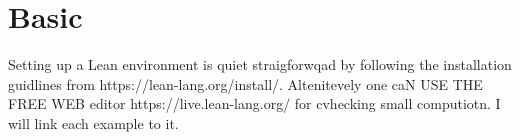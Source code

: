 

\section{Basic}
Setting up a Lean environment is quiet straigforwqad by following 
the installation guidlines from https://lean-lang.org/install/.
Altenitevely one caN USE THE FREE WEB editor https://live.lean-lang.org/ for cvhecking small computiotn.
I will link each example to it.

